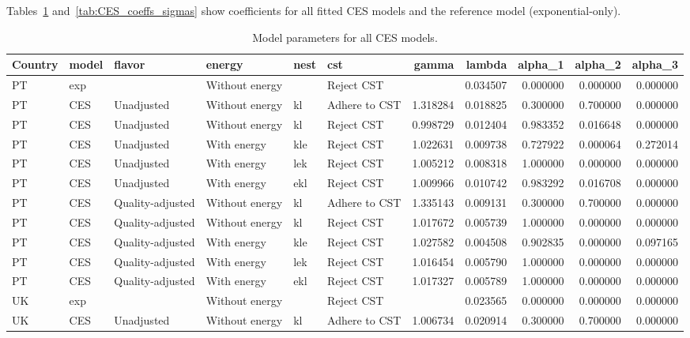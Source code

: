 \documentclass[preprint,authoryear,12pt]{elsarticle}\usepackage[]{graphicx}\usepackage[]{color}
\begin{document}
%
Tables~\ref{tab:CES_coeffs} and~\ref{tab:CES_coeffs_sigmas} show 
coefficients for all fitted CES models and the reference model (exponential-only).
%
\begin{table}[ht]
\centering
\caption{Model parameters for all CES models.} 
\label{tab:CES_coeffs}
{\tiny
\begin{tabular}{llllllrrrrr}
  \hline
Country & model & flavor & energy & nest & cst & gamma & lambda & alpha\_1 & alpha\_2 & alpha\_3 \\ 
  \hline
PT & exp &  & Without energy &  & Reject CST &  & 0.034507 & 0.000000 & 0.000000 & 0.000000 \\ 
  PT & CES & Unadjusted & Without energy & kl & Adhere to CST & 1.318284 & 0.018825 & 0.300000 & 0.700000 & 0.000000 \\ 
  PT & CES & Unadjusted & Without energy & kl & Reject CST & 0.998729 & 0.012404 & 0.983352 & 0.016648 & 0.000000 \\ 
  PT & CES & Unadjusted & With energy & kle & Reject CST & 1.022631 & 0.009738 & 0.727922 & 0.000064 & 0.272014 \\ 
  PT & CES & Unadjusted & With energy & lek & Reject CST & 1.005212 & 0.008318 & 1.000000 & 0.000000 & 0.000000 \\ 
  PT & CES & Unadjusted & With energy & ekl & Reject CST & 1.009966 & 0.010742 & 0.983292 & 0.016708 & 0.000000 \\ 
  PT & CES & Quality-adjusted & Without energy & kl & Adhere to CST & 1.335143 & 0.009131 & 0.300000 & 0.700000 & 0.000000 \\ 
  PT & CES & Quality-adjusted & Without energy & kl & Reject CST & 1.017672 & 0.005739 & 1.000000 & 0.000000 & 0.000000 \\ 
  PT & CES & Quality-adjusted & With energy & kle & Reject CST & 1.027582 & 0.004508 & 0.902835 & 0.000000 & 0.097165 \\ 
  PT & CES & Quality-adjusted & With energy & lek & Reject CST & 1.016454 & 0.005790 & 1.000000 & 0.000000 & 0.000000 \\ 
  PT & CES & Quality-adjusted & With energy & ekl & Reject CST & 1.017327 & 0.005789 & 1.000000 & 0.000000 & 0.000000 \\ 
  UK & exp &  & Without energy &  & Reject CST &  & 0.023565 & 0.000000 & 0.000000 & 0.000000 \\ 
  UK & CES & Unadjusted & Without energy & kl & Adhere to CST & 1.006734 & 0.020914 & 0.300000 & 0.700000 & 0.000000 \\ 

\end{tabular}}
\end{table}
\end{document}
